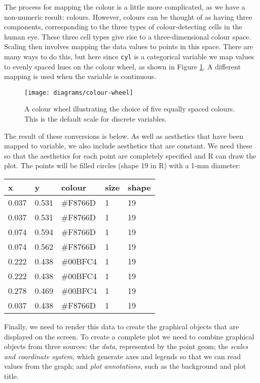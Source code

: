 The process for mapping the colour is a little more complicated, as we
have a non-numeric result: colours. However, colours can be thought of
as having three components, corresponding to the three types of
colour-detecting cells in the human eye. These three cell types give
rise to a three-dimensional colour space. Scaling then involves mapping
the data values to points in this space. There are many ways to do this,
but here since \texttt{cyl} is a categorical variable we map values to
evenly spaced hues on the colour wheel, as shown in Figure
\ref{fig:colour-wheel}. A different mapping is used when the variable is
continuous. 

\begin{figure}[htbp]
  \centering
    \texttt{[image: diagrams/colour-wheel]}
  \caption{A colour wheel illustrating the choice of five equally spaced colours. This is the default scale for discrete variables.}
  \label{fig:colour-wheel}
\end{figure}

The result of these conversions is below. As well as aesthetics that
have been mapped to variable, we also include aesthetics that are
constant. We need these so that the aesthetics for each point are
completely specified and R can draw the plot. The points will be filled
circles (shape 19 in R) with a 1-mm diameter:

\begin{longtable}[c]{@{}lllll@{}}
\toprule
x & y & colour & size & shape\tabularnewline
\midrule
\endhead
0.037 & 0.531 & \#F8766D & 1 & 19\tabularnewline
0.037 & 0.531 & \#F8766D & 1 & 19\tabularnewline
0.074 & 0.594 & \#F8766D & 1 & 19\tabularnewline
0.074 & 0.562 & \#F8766D & 1 & 19\tabularnewline
0.222 & 0.438 & \#00BFC4 & 1 & 19\tabularnewline
0.222 & 0.438 & \#00BFC4 & 1 & 19\tabularnewline
0.278 & 0.469 & \#00BFC4 & 1 & 19\tabularnewline
0.037 & 0.438 & \#F8766D & 1 & 19\tabularnewline
\bottomrule
\end{longtable}

Finally, we need to render this data to create the graphical objects
that are displayed on the screen. To create a complete plot we need to
combine graphical objects from three sources: the \emph{data},
represented by the point geom; the \emph{scales and coordinate system},
which generate axes and legends so that we can read values from the
graph; and \emph{plot annotations}, such as the background and plot
title.



